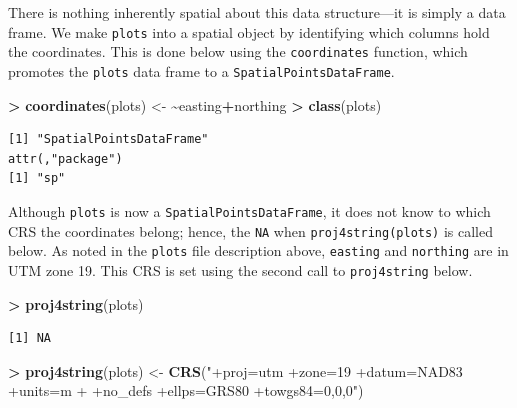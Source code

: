 \documentclass[
]{krantz}
\makeatletter
\newenvironment{Shaded}{\begin{snugshade}}{\end{snugshade}}
\newcommand{\ErrorTok}[1]{\textcolor[rgb]{0.14,0.14,0.14}{\textbf{#1}}}
\newcommand{\KeywordTok}[1]{\textcolor[rgb]{0.27,0.27,0.27}{\textbf{#1}}}
\newcommand{\NormalTok}[1]{#1}
\newcommand{\OperatorTok}[1]{\textcolor[rgb]{0.43,0.43,0.43}{\textbf{#1}}}
\newcommand{\StringTok}[1]{\textcolor[rgb]{0.5,0.5,0.5}{#1}}
\newenvironment{kframe}{%
\medskip{}
\setlength{\fboxsep}{.8em}
 \def\at@end@of@kframe{}%
 \ifinner\ifhmode%
  \def\at@end@of@kframe{\end{minipage}}%
  \begin{minipage}{\columnwidth}%
 \fi\fi%
 \def\FrameCommand##1{\hskip\@totalleftmargin \hskip-\fboxsep
 \colorbox{shadecolor}{##1}\hskip-\fboxsep
     \hskip-\linewidth \hskip-\@totalleftmargin \hskip\columnwidth}%
 \MakeFramed {\advance\hsize-\width
   \@totalleftmargin\z@ \linewidth\hsize
   \@setminipage}}%
 {\par\unskip\endMakeFramed%
 \at@end@of@kframe}
\renewenvironment{Shaded}{\begin{kframe}}{\end{kframe}}
\makeatother
\begin{document}
There is nothing inherently spatial about this data structure---it is simply a data frame. We make \texttt{plots} into a spatial object by identifying which columns hold the coordinates. This is done below using the \texttt{coordinates} function, which promotes the \texttt{plots} data frame to a \texttt{SpatialPointsDataFrame}.

\begin{Shaded}
\begin{Highlighting}[]
\OperatorTok{\textgreater{}}\StringTok{ }\KeywordTok{coordinates}\NormalTok{(plots) \textless{}{-}}\StringTok{ }\ErrorTok{\textasciitilde{}}\NormalTok{easting}\OperatorTok{+}\NormalTok{northing}
\OperatorTok{\textgreater{}}\StringTok{ }\KeywordTok{class}\NormalTok{(plots)}
\end{Highlighting}
\end{Shaded}

\begin{verbatim}
[1] "SpatialPointsDataFrame"
attr(,"package")
[1] "sp"
\end{verbatim}

Although \texttt{plots} is now a \texttt{SpatialPointsDataFrame}, it does not know to which CRS the coordinates belong; hence, the \texttt{NA} when \texttt{proj4string(plots)} is called below. As noted in the \texttt{plots} file description above, \texttt{easting} and \texttt{northing} are in UTM zone 19. This CRS is set using the second call to \texttt{proj4string} below.

\begin{Shaded}
\begin{Highlighting}[]
\OperatorTok{\textgreater{}}\StringTok{ }\KeywordTok{proj4string}\NormalTok{(plots)}
\end{Highlighting}
\end{Shaded}

\begin{verbatim}
[1] NA
\end{verbatim}

\begin{Shaded}
\begin{Highlighting}[]
\OperatorTok{\textgreater{}}\StringTok{ }\KeywordTok{proj4string}\NormalTok{(plots) \textless{}{-}}\StringTok{ }\KeywordTok{CRS}\NormalTok{(}\StringTok{"+proj=utm +zone=19 +datum=NAD83 +units=m }
\StringTok{+                              +no\_defs +ellps=GRS80 +towgs84=0,0,0"}\NormalTok{)                   }
\end{Highlighting}
\end{Shaded}
\end{document}
